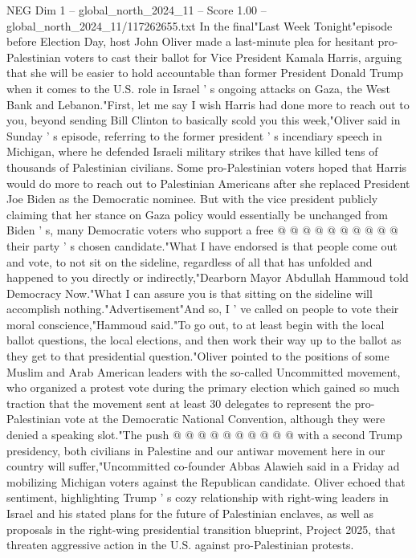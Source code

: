\begin{textsample}{NEG Dim 1 – global\_north\_2024\_11 – Score 1.00 – global\_north\_2024\_11/117262655.txt}  \label{ex:f1_neg_117}
In the final"Last Week Tonight"episode before Election Day, host John Oliver made a last-minute plea for hesitant pro-Palestinian voters to cast their ballot for Vice President Kamala Harris, arguing that she will be easier to hold accountable than former President Donald Trump when it comes to the U.S. role in Israel ' s ongoing attacks on Gaza, the West Bank and Lebanon."First, let me say I wish Harris had done more to reach out to you, beyond sending Bill Clinton to basically scold you this week,"Oliver said in Sunday ' s episode, referring to the former president ' s incendiary speech in Michigan, where he defended Israeli military strikes that have killed tens of thousands of Palestinian civilians.
Some pro-Palestinian voters hoped that Harris would do more to reach out to Palestinian Americans after she replaced President Joe Biden as the Democratic nominee.
But with the vice president publicly claiming that her stance on Gaza policy would essentially be unchanged from Biden ' s, many Democratic voters who support a free @ @ @ @ @ @ @ @ @ @ their party ' s chosen candidate."What I have endorsed is that people come out and vote, to not sit on the sideline, regardless of all that has unfolded and happened to you directly or indirectly,"Dearborn Mayor Abdullah Hammoud told Democracy Now."What I can assure you is that sitting on the sideline will accomplish nothing."Advertisement"And so, I ' ve called on people to vote their moral conscience,"Hammoud said."To go out, to at least begin with the local ballot questions, the local elections, and then work their way up to the ballot as they get to that presidential question."Oliver pointed to the positions of some Muslim and Arab American leaders with the so-called Uncommitted movement, who organized a protest vote during the primary election which gained so much traction that the movement sent at least 30 delegates to represent the pro-Palestinian vote at the Democratic National Convention, although they were denied a speaking slot."The push @ @ @ @ @ @ @ @ @ @ with a second Trump presidency, both civilians in Palestine and our antiwar movement here in our country will suffer,"Uncommitted co-founder Abbas Alawieh said in a Friday ad mobilizing Michigan voters against the Republican candidate.
Oliver echoed that sentiment, highlighting Trump ' s cozy relationship with right-wing leaders in Israel and his stated plans for the future of Palestinian enclaves, as well as proposals in the right-wing presidential transition blueprint, Project 2025, that threaten aggressive action in the U.S. against pro-Palestinian protests.

\end{textsample}
